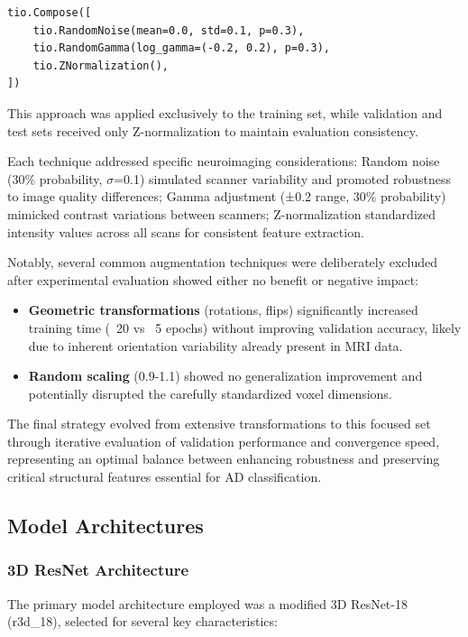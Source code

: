 \documentclass[12pt, a4paper]{article}
\begin{document}
\begin{verbatim}
tio.Compose([
    tio.RandomNoise(mean=0.0, std=0.1, p=0.3),
    tio.RandomGamma(log_gamma=(-0.2, 0.2), p=0.3),
    tio.ZNormalization(),
])
\end{verbatim}

This approach was applied exclusively to the training set, while validation and test sets received only Z-normalization to maintain evaluation consistency.


Each technique addressed specific neuroimaging considerations: Random noise (30\% probability, $\sigma$=0.1) simulated scanner variability and promoted robustness to image quality differences; Gamma adjustment (±0.2 range, 30\% probability) mimicked contrast variations between scanners; Z-normalization standardized intensity values across all scans for consistent feature extraction.

Notably, several common augmentation techniques were deliberately excluded after experimental evaluation showed either no benefit or negative impact:

\begin{itemize}
    \item \textbf{Geometric transformations} (rotations, flips) significantly increased training time (~20 vs ~5 epochs) without improving validation accuracy, likely due to inherent orientation variability already present in MRI data.
    
    \item \textbf{Random scaling} (0.9-1.1) showed no generalization improvement and potentially disrupted the carefully standardized voxel dimensions.
\end{itemize}

The final strategy evolved from extensive transformations to this focused set through iterative evaluation of validation performance and convergence speed, representing an optimal balance between enhancing robustness and preserving critical structural features essential for AD classification.
\subsection{Model Architectures}
\subsubsection{3D ResNet Architecture}

The primary model architecture employed was a modified 3D ResNet-18 (r3d\_18), selected for several key characteristics:
\end{document}
